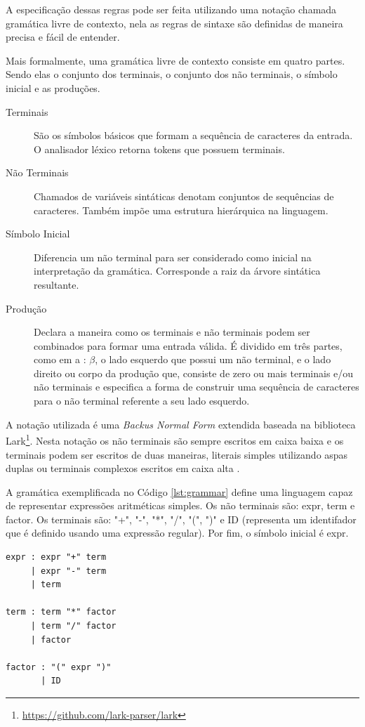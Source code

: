 A especificação dessas regras pode ser feita utilizando uma notação chamada gramática 
livre de contexto, nela as regras de sintaxe são definidas de 
maneira precisa e fácil de entender.

Mais formalmente, uma gramática livre de contexto consiste em quatro partes. Sendo elas
o conjunto dos terminais, o conjunto dos não terminais, o símbolo inicial e as produções.

\begin{description}
    \item[Terminais] São os símbolos básicos que formam a sequência de 
    caracteres da entrada. O analisador léxico retorna tokens que possuem terminais. 
    \item [Não Terminais] Chamados de variáveis sintáticas denotam conjuntos 
    de sequências de caracteres. Também impõe uma estrutura hierárquica na linguagem.
    \item[Símbolo Inicial] Diferencia um não terminal para ser considerado 
    como inicial na interpretação da gramática. Corresponde a raiz da árvore sintática
    resultante.
    \item[Produção] Declara a maneira como os terminais e não terminais 
    podem ser combinados para formar uma entrada válida. É dividido em três partes,
    como em a : $\beta$, o lado esquerdo que possui um não terminal, e o lado direito 
    ou corpo da produção que, consiste de zero ou mais terminais e/ou não terminais e especifica
    a forma de construir uma sequência de caracteres para o não terminal referente a seu lado esquerdo.
\end{description}

A notação utilizada é uma \textit{Backus Normal Form} extendida baseada na 
biblioteca Lark\footnote{\url{https://github.com/lark-parser/lark}}. Nesta notação os não 
terminais são sempre escritos em caixa baixa e os terminais podem ser escritos de duas 
maneiras, literais simples utilizando aspas duplas ou terminais complexos escritos em caixa alta \cite{lark}.

A gramática exemplificada no Código \ref{lst:grammar} define uma linguagem capaz de representar 
expressões aritméticas simples. Os não terminais são: expr, term e factor. 
Os terminais são: "+", "-", "*", "/", "(", ")" e ID (representa um identifador que é definido usando
uma expressão regular). Por fim, o símbolo inicial é expr.

\begin{lstlisting}[caption=Exemplo de gramática livre do context que descreve expressões
    aritméticas como (20 + 1) * 2.,label={lst:grammar}]
expr : expr "+" term 
     | expr "-" term
     | term

term : term "*" factor
     | term "/" factor
     | factor

factor : "(" expr ")"
       | ID
\end{lstlisting}

